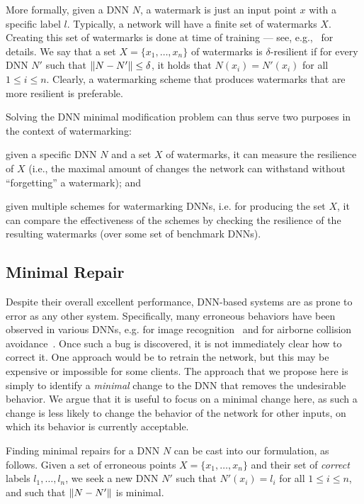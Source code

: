 \documentclass{easychair}
\begin{document}
More formally, given a DNN $N$, a watermark is just an input point $x$
with a specific label $l$. Typically, a network will have a finite set of
watermarks $X$. Creating this set of watermarks is done at time of
training --- see, e.g.,~\cite{AdBaPiKeWatermarking} for details. We
say that a set $X=\{x_1,\ldots,x_n\}$ of watermarks is $\delta$-resilient if for every
DNN $N'$ such that $\left\lVert N-N'\right\rVert\leq \delta$, it holds that
$N(x_i)=N'(x_i)$ for all $1\leq i \leq n$. Clearly, a watermarking
scheme that produces watermarks that are more resilient is preferable.

Solving the DNN minimal modification problem can thus serve two
purposes in the context of watermarking:
\begin{inparaenum}[(i)]
  \item given a specific DNN $N$ and a set $X$ of watermarks, it can
    measure the resilience of $X$ (i.e., the maximal amount of changes
    the network can withstand without ``forgetting'' a  watermark);
    and
  \item given multiple schemes for watermarking DNNs, i.e. for
    producing the set $X$, it can compare the effectiveness of the
    schemes by checking the resilience of the resulting watermarks
    (over some set of benchmark DNNs).
\end{inparaenum}
  
\subsection{Minimal Repair}
Despite their overall excellent performance, DNN-based systems are as
prone to error as any other system. Specifically, many erroneous
behaviors have been observed in various DNNs, e.g. for image
recognition~\cite{EyEvFeLiRaXiPrKo18,SzZaSuBrErGoFe13} and for airborne collision
avoidance~\cite{JuLoBrOwKo16,KaBaDiJuKo17Reluplex}. Once such a bug is
discovered, it is not immediately clear how to correct it. One
approach would be to retrain the network, but this may be expensive
or impossible for some clients. The approach that we propose here is
simply to identify a \emph{minimal} change to the DNN that removes the
undesirable behavior. We argue that it is useful to focus on a minimal
change here, as such a change is less likely to change the behavior of
the network for other inputs, on which its behavior is currently acceptable.

Finding minimal repairs for a DNN $N$ can be cast into our
formulation, as follows. Given a set of erroneous points
$X=\{x_1,\ldots,x_n\}$ and their set of \emph{correct} labels
$l_1,\ldots,l_n$, we seek a new DNN $N'$ such that $N'(x_i)=l_i$ for
all $1\leq i \leq n$, and such that 
 $\left\lVert N-N'\right\rVert$ is minimal. 
\end{document}
